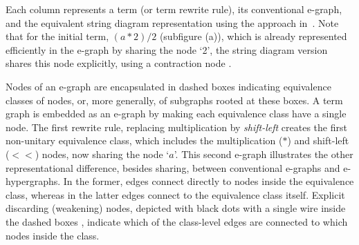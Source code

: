 \documentclass[peerreviewcls]{IEEEtran}
\begin{document}
Each column represents a term (or term rewrite rule), its conventional e-graph, and the equivalent string diagram representation using the approach in~\cite{ghica2024equivalencehypergraphsegraphsmonoidal}. 
Note that for the initial term, $(a*2)/2$ (subfigure (a)), which is already represented efficiently in the e-graph by sharing the node `2', the string diagram version shares this node explicitly, using a contraction node
. 

Nodes of an e-graph are encapsulated in dashed boxes indicating equivalence classes of nodes, or, more generally, of subgraphs rooted at these boxes.
A term graph is embedded as an e-graph by making each equivalence class have a single node.
The first rewrite rule, replacing multiplication by \emph{shift-left} creates the first non-unitary equivalence class, which includes the multiplication ($*$) and shift-left ($<\!\!<$) nodes,  now sharing the node `$a$'.
This second e-graph illustrates the other representational difference, besides sharing, between conventional e-graphs and e-hypergraphs.
In the former, edges connect directly to nodes inside the equivalence class, whereas in the latter edges connect to the equivalence class itself.
Explicit discarding (weakening) nodes, depicted with black dots with a single wire inside the dashed boxes 
, indicate which of the class-level edges are connected to which nodes inside the class.
\end{document}
